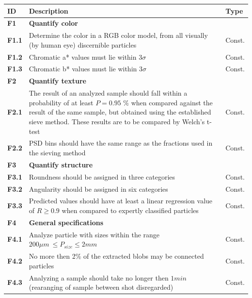 \documentclass[11pt,fleqn,,a4paper,twoside,openright]{book}
\begin{document}
\begin{longtable}{|p{1cm}| p{10cm} p{1.5cm}|}
\hline 
\textbf{ID} & \textbf{Description} & \textbf{Type} \\
\endhead
\hline
\textbf{F1}\label{F1} & \textbf{Quantify color} &  \\ 
\hline 
\textbf{F1.1}\label{F1.1} & Determine the color in a RGB color model, from all visually (by human eye) discernible particles & Const. \\ 
\hline
\textbf{F1.2}\label{F1.2} & Chromatic a* values must lie within $3 \sigma$ & Const. \\ 
\hline 
\textbf{F1.3}\label{F1.3} & Chromatic b* values must lie within $3 \sigma$ & Const. \\ 
\hline 
\textbf{F2}\label{F2} & \textbf{Quantify texture} &  \\ 
\hline 
\textbf{F2.1}\label{F2.1} & The result of an analyzed sample should fall within a probability of at least $P = 0.95$ \% when compared against the result of the same sample, but obtained using the established sieve method. These results are to be compared by Welch's t-test  &  Const. \\ 
\hline 
\textbf{F2.2}\label{F2.2} & PSD bins should have the same range as the fractions used in the sieving method & Const. \\
\hline 
\textbf{F3}\label{F3} & \textbf{Quantify structure}  &  \\ 
\hline 
\textbf{F3.1}\label{F3.1} & Roundness should be assigned in three categories  & Const. \\ 
\hline 
\textbf{F3.2}\label{F3.2} & Angularity should be assigned in six categories  & Const. \\ 
\hline 
\textbf{F3.3}\label{F3.3} & Predicted values should have at least a linear regression value of $ R \geq 0.9 $ when compared to expertly classified particles & Const.  \\ 
\hline 
\textbf{F4}\label{F4} & \textbf{General specifications} &  \\ 
\hline 
\textbf{F4.1}\label{F4.1} & Analyze particle with sizes within the range $ 200 \mu m\ \leq P_{size} \leq 2 mm $& Const. \\ 
\hline 
\textbf{F4.2}\label{F4.2} & No more then 2\% of the extracted blobs may be connected particles & Const. \\ 
\hline 
\textbf{F4.3}\label{F4.3} & Analyzing a sample should take no longer then $ 1 min$ (rearanging of sample between shot disregarded) & Const. \\
\hline 

\end{longtable}
\end{document}
